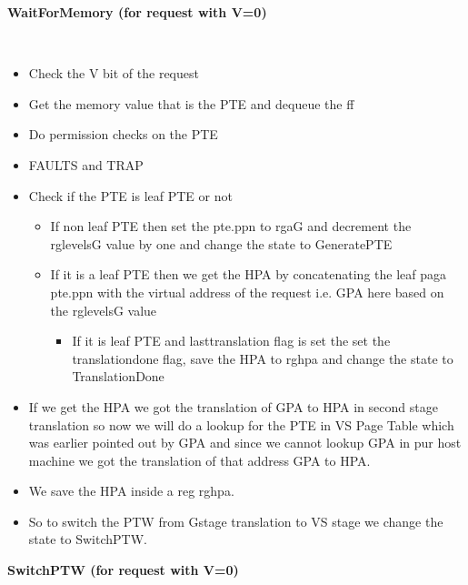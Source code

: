 \documentclass{article}
\newcommand{\resheading}[1]{{\small \colorbox{mygrey}{\begin{minipage}{0.975\textwidth}{\textbf{#1 \vphantom{p\^{E}}}}\end{minipage}}}}
\begin{document}
\resheading{\textbf{WaitForMemory  (for request with V=0) }}\\

\begin{itemize}
\item Check the V bit of the request
\item Get the memory value that is the PTE and dequeue the ff 
\item Do permission checks on the PTE
\item FAULTS and TRAP
\item Check if the PTE is leaf PTE or not
\begin{itemize}
\item If non leaf PTE then set the pte.ppn to rg\textunderscore a\textunderscore G and decrement the rg\textunderscore levels\textunderscore G  value by one and change the state to GeneratePTE
\item If it is a leaf PTE then we get the HPA by concatenating the leaf paga pte.ppn with the virtual address of the request i.e. GPA here based on the rg\textunderscore levels\textunderscore G value

\begin{itemize}
\item If it is leaf PTE and last\textunderscore translation flag  is set the set the translation\textunderscore done flag, save the HPA to rg\textunderscore hpa and change the state to TranslationDone

\end{itemize}
\end{itemize}
\item If we get the HPA we got the translation of GPA to HPA in second stage translation so now we will do a lookup for the  PTE in VS Page Table which was earlier pointed out by GPA and since we cannot lookup GPA in pur host machine we got the translation of that address GPA to HPA.
\item We save the HPA inside a reg rg\textunderscore hpa.
\item So to switch the PTW  from Gstage translation to VS stage we change the state to SwitchPTW.
\end{itemize}
 

\resheading{\textbf{SwitchPTW (for request with V=0)}}\\ 
\end{document}
